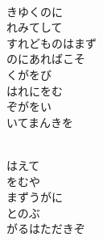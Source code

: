 \documentclass[10pt,b5j]{tarticle} %
\begin{document}
\vspace{1.5em} %
\newcommand{\linespace}{0.5em} %
\newcommand{\blocksize}{0.5\hsize} %
\newcommand{\itemmargin}{3em} %
\begin{enumerate} %
    \setlength{\itemindent}{\itemmargin} %
    \begin{minipage}[c]{\blocksize}
    
        \vspace{\linespace}
        \item~\\
        きゆくのに\\
        れみてして\\
        すれどものはまず\\
        のにあればこそ\\
        くがをび\\
        はれにをむ\\
        ぞがをい\\
        いてまんきを
        
    \end{minipage}
    \begin{minipage}[c]{\blocksize}
        
        \vspace{\linespace}
        \item~\\
        はえて\\
        をむや\\
        まずうがに\\
        とのぶ\\
        がるはただきぞ
        
    \end{minipage}
    \begin{minipage}[c]{\blocksize}
        

\end{minipage}
\end{enumerate}
\end{document}
